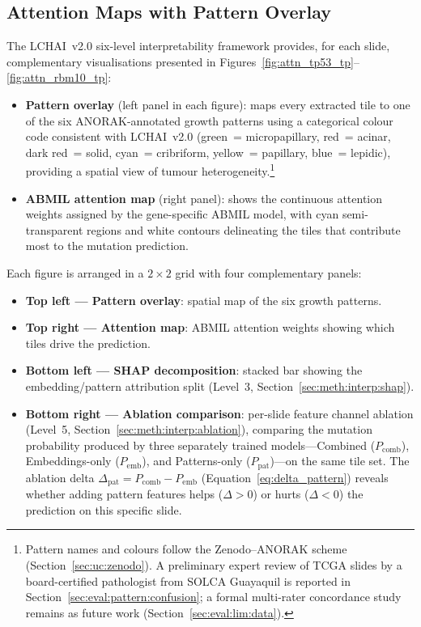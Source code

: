\subsection{Attention Maps with Pattern Overlay}
\label{sec:eval:interp:attention}

The LCHAI~v2.0 six-level interpretability framework provides, for each
slide, complementary visualisations presented
in Figures~\ref{fig:attn_tp53_tp}--\ref{fig:attn_rbm10_tp}:

\begin{itemize}
    \item \textbf{Pattern overlay} (left panel in each figure): maps
    every extracted tile to one of the six ANORAK-annotated growth patterns using a
    categorical colour code consistent with LCHAI~v2.0 (green~= micropapillary,
    red~= acinar, dark red~= solid, cyan~= cribriform, yellow~= papillary,
    blue~= lepidic), providing a spatial view of tumour heterogeneity.\footnote{Pattern names and colours follow the Zenodo--ANORAK scheme (Section~\ref{sec:uc:zenodo}). A preliminary expert review of TCGA slides by a board-certified pathologist from SOLCA Guayaquil is reported in Section~\ref{sec:eval:pattern:confusion}; a formal multi-rater concordance study remains as future work (Section~\ref{sec:eval:lim:data}).}

    \item \textbf{ABMIL attention map} (right panel): shows the
    continuous attention weights assigned by the gene-specific ABMIL
    model, with cyan semi-transparent regions and white contours
    delineating the tiles that contribute most to the mutation
    prediction.
\end{itemize}

Each figure is arranged in a $2 \times 2$ grid with four
complementary panels:

\begin{itemize}
    \item \textbf{Top left --- Pattern overlay}: spatial map of the six
    growth patterns.
    \item \textbf{Top right --- Attention map}: ABMIL attention weights
    showing which tiles drive the prediction.
    \item \textbf{Bottom left --- SHAP decomposition}: stacked bar
    showing the embedding/pattern attribution split (Level~3,
    Section~\ref{sec:meth:interp:shap}).
    \item \textbf{Bottom right --- Ablation comparison}: per-slide
    feature channel ablation (Level~5,
    Section~\ref{sec:meth:interp:ablation}), comparing the mutation
    probability produced by three separately trained models---Combined
    ($P_{\text{comb}}$), Embeddings-only ($P_{\text{emb}}$), and
    Patterns-only ($P_{\text{pat}}$)---on the same tile set.
    The ablation delta $\Delta_{\text{pat}} = P_{\text{comb}} -
    P_{\text{emb}}$ (Equation~\ref{eq:delta_pattern}) reveals whether
    adding pattern features helps ($\Delta > 0$) or hurts
    ($\Delta < 0$) the prediction on this specific slide.
\end{itemize}

